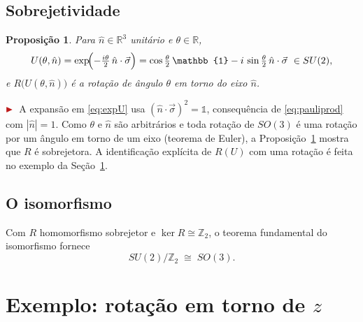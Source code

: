 \documentclass[12pt,a4paper]{article}
\newcommand{\marcador}{\ensuremath{\color{corDestaque}\blacktriangleright}\,}
\newenvironment{nota}{\par\color{corDestaque}\noindent\marcador\ignorespaces}{\par}
\newcommand{\R}{\mathbb{R}}
\newcommand{\Z}{\mathbb{Z}}
\newcommand{\id}{\mathbb{1}}                 %
\newcommand{\vsig}{\vec{\sigma}}
\newcommand{\vn}{\hat{n}}
\theoremstyle{definition}
\theoremstyle{plain}
\newtheorem{proposicao}{Proposição}
\theoremstyle{remark}
\begin{document}
\subsection*{Sobrejetividade}
\begin{proposicao}\label{prop:exp}
Para $\vn\in\R^3$ unitário e $\theta\in\R$,
\begin{equation}\label{eq:expU}
  U(\theta,\vn)=\exp\!\Bigl(-\tfrac{i\theta}{2}\,\vn\cdot\vsig\Bigr)
  =\cos\tfrac{\theta}{2}\,\id-i\,\sin\tfrac{\theta}{2}\,\vn\cdot\vsig
  \ \in SU(2),
\end{equation}
e $R\bigl(U(\theta,\vn)\bigr)$ é a rotação de ângulo $\theta$ em torno do
eixo $\vn$.
\end{proposicao}
\begin{nota}
A expansão em \eqref{eq:expU} usa $(\vn\cdot\vsig)^2=\id$, consequência de
\eqref{eq:pauliprod} com $|\vn|=1$. Como $\theta$ e $\vn$ são arbitrários e
toda rotação de $SO(3)$ é uma rotação por um ângulo em torno de um eixo
(teorema de Euler), a Proposição~\ref{prop:exp} mostra que $R$ é
sobrejetora. A identificação explícita de $R(U)$ com uma rotação é feita no
exemplo da Seção~\ref{sec:exemplo}.
\end{nota}

\subsection*{O isomorfismo}
Com $R$ homomorfismo sobrejetor e $\ker R\cong\Z_2$, o teorema fundamental
do isomorfismo fornece
\begin{equation}\label{eq:iso}
  \boxed{\,SU(2)/\Z_2\;\cong\;SO(3).\,}
\end{equation}

\section{Exemplo: rotação em torno de $z$}\label{sec:exemplo}
\end{document}
